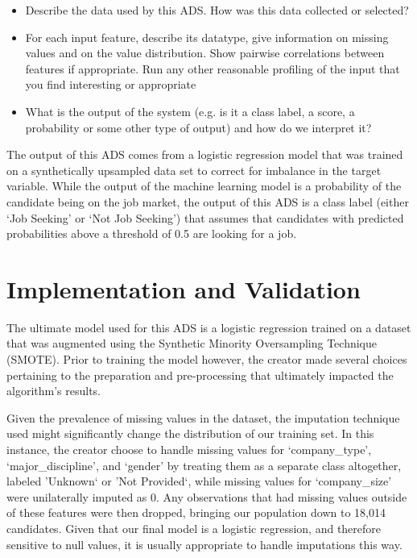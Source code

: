 \begin{itemize}
	\item Describe the data used by this ADS.  How was this data collected or selected?
	\item For each input feature, describe its datatype, give information on missing values and on the value distribution. Show pairwise correlations between features if appropriate.  Run any other reasonable profiling of the input that you find interesting or appropriate
	\item What is the output of the system (e.g. is it a class label, a score, a probability or some other type of output) and how do we interpret it?
\end{itemize}


The output of this ADS comes from a logistic regression model that was trained on a synthetically upsampled data set to correct for imbalance in the target variable.  While the output of the machine learning model is a probability of the candidate being on the job market, the output of this ADS is a class label (either `Job Seeking' or `Not Job Seeking') that assumes that candidates with predicted probabilities above a threshold of 0.5 are looking for a job.




\pagebreak

\section{Implementation and Validation}

The ultimate model used for this ADS is a logistic regression trained on a dataset that was augmented using the Synthetic Minority Oversampling Technique (SMOTE).  Prior to training the model however, the creator made several choices pertaining to the preparation and pre-processing that ultimately impacted the algorithm's results.

Given the prevalence of missing values in the dataset, the imputation technique used might significantly change the distribution of our training set.  In this instance, the creator choose to handle missing values for `company\_type', `major\_discipline', and `gender' by treating them as a separate class altogether, labeled 'Unknown` or 'Not Provided`, while missing values for `company\_size' were unilaterally imputed as 0. Any observations that had missing values outside of these features were then dropped, bringing our population down to 18,014 candidates. Given that our final model is a logistic regression, and therefore sensitive to null values, it is usually appropriate to handle imputations this way.

